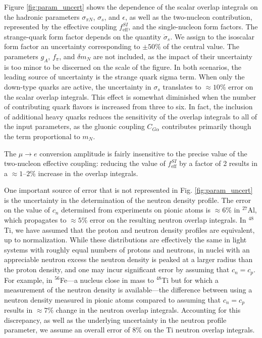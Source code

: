 \documentclass[12pt,letterpaper]{book}
\begin{document}
Figure \ref{fig:param_uncert} shows the dependence of the scalar overlap integrals on the hadronic parameters $\sigma_{\pi N}$, $\sigma_s$, and $\epsilon$, as well as the two-nucleon contribution, represented by the effective coupling $f_\mathrm{eff}^{SI}$, and the single-nucleon form factors. The strange-quark form factor depends on the quantity $\dot{\sigma}_s$. We assign to the isoscalar form factor an uncertainty corresponding to $\pm 50\%$ of the central value. The parameters $g_A$, $f_{\pi}$, and $\delta m_N$ are not included, as the impact of their uncertainty is too minor to be discerned on the scale of the figure. In both scenarios, the leading source of uncertainty is the strange quark sigma term. When only the down-type quarks are active, the uncertainty in $\sigma_s$ translates to $\approx 10\%$ error on the scalar overlap integrals. This effect is somewhat diminished when the number of contributing quark flavors is increased from three to six. In fact, the inclusion of additional heavy quarks reduces the sensitivity of the overlap integrals to all of the input parameters, as the gluonic coupling $C_{G\alpha}$ contributes primarily though the term proportional to $m_N$. 

The $\mu\rightarrow e$ conversion amplitude is fairly insensitive to the precise value of the two-nucleon effective coupling: reducing the value of $f^{SI}_\mathrm{eff}$ by a factor of 2 results in a $\approx 1$--$2\%$ increase in the overlap integrals.

One important source of error that is not represented in Fig. \ref{fig:param_uncert} is the uncertainty in the determination of the neutron density profile. The error on the value of $c_n$ determined from experiments on pionic atoms is $\approx 6\%$ in $^{27}$Al, which propagates to $\approx 5\%$ error on the resulting neutron overlap integrals. In $^{48}$Ti, we have assumed that the proton and neutron density profiles are equivalent, up to normalization. While these distributions are effectively the same in light systems with roughly equal numbers of protons and neutrons, in nuclei with an appreciable neutron excess the neutron density is peaked at a larger radius than the proton density, and one may incur significant error by assuming that $c_n=c_p$. For example, in $^{56}$Fe---a nucleus close in mass to $^{48}$Ti but for which a measurement of the neutron density is available---the difference between using a neutron density measured in pionic atoms compared to assuming that $c_n=c_p$ results in $\approx 7\%$ change in the neutron overlap integrals. Accounting for this discrepancy, as well as the underlying uncertainty in the neutron profile parameter, we assume an overall error of $8\%$ on the Ti neutron overlap integrals.
\end{document}
